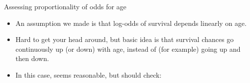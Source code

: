\begin{frame}[fragile]{Assessing proportionality of odds for age}
  \begin{itemize}
  \item An assumption we made is that log-odds of survival depends
    linearly on age.
  \item Hard to get your head around, but 
    basic idea is that survival chances go continuously up (or down)
    with age, instead of (for example) going up and then down.
  \item In this case, seems reasonable, but should check:

\begin{knitrout}
\color{fgcolor}\begin{kframe}
\begin{alltt}
\end{alltt}


{\ttfamily\noindent\itshape\color{messagecolor}{\#\# Loading tidyverse: ggplot2\\\#\# Loading tidyverse: tibble\\\#\# Loading tidyverse: tidyr\\\#\# Loading tidyverse: readr\\\#\# Loading tidyverse: purrr\\\#\# Loading tidyverse: dplyr}}

{\ttfamily\noindent\itshape\color{messagecolor}{\#\# Conflicts with tidy packages ----------------------------------------------}}

{\ttfamily\noindent\itshape\color{messagecolor}{\#\# filter(): dplyr, stats\\\#\# lag():\ \ \ \ dplyr, stats}}\end{kframe}
\end{knitrout}
  \end{itemize}
    

\end{frame}
 

